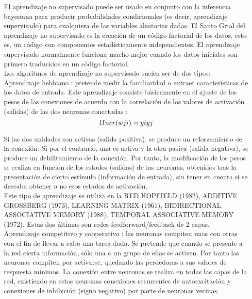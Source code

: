 \documentclass{article}
\theoremstyle{definition}
\theoremstyle{remark}
\begin{document}
El aprendizaje no supervisado puede ser usado en conjunto con la inferencia bayesiana para producir probabilidades condicionales (es decir, aprendizaje supervisado) para cualquiera de las variables aleatorias dadas. El Santo Grial del aprendizaje no supervisado es la creación de un código factorial de los datos, esto es, un código con componentes estadísticamente independientes. El aprendizaje supervisado normalmente funciona mucho mejor cuando los datos iniciales son primero traducidos en un código factorial.\\

Los algoritmos de aprendizaje no supervisado suelen ser de dos tipos: \\

Aprendizaje hebbiano : pretende medir la familiaridad o extraer características de los datos de entrada. Este aprendizaje consiste básicamente en el ajuste de los pesos de las conexiones de acuerdo con la correlación de los valores de activación (salidas) de las dos neuronas conectadas : \\

\begin{equation}\\l
  Incr (wji) = yi yj
\end{equation}

Si las dos unidades son activas (salida positiva), se produce un reforzamiento de la conexión. Si por el contrario, una es activa y la otra pasiva (salida negativa), se produce un debilitamiento de la conexión. Por tanto, la modificación de los pesos se realiza en función de los estados (salidas) de las neuronas, obtenidos tras la presentación de cierto estímulo (información de entrada), sin tener en cuenta si se deseaba obtener o no esos estados de activación.\\
Este tipo de aprendizaje se utiliza en la RED HOPFIELD (1982), ADDITIVE GROSSBERG (1973), LEARNING MATRIX (1961), BIDIRECTIONAL ASSOCIATIVE MEMORY (1988), TEMPORAL ASSOCIATIVE MEMORY (1972). Estas dos últimas son redes feedforward/feedback de 2 capas.\\
Aprendizaje competitivo y cooperativo : las neuronas compiten unas con otras con el fin de llevar a cabo una tarea dada. Se pretende que cuando se presente a la red cierta información, sólo una o un grupo de ellas se activen. Por tanto las neuronas compiten por activarse, quedando las perdedoras a sus valores de respuesta mínimos. La conexión entre neuronas se realiza en todas las capas de la red, existiendo en estas neuronas conexiones recurrentes de autoexcitación y conexiones de inhibición (signo negativo) por parte de neuronas vecinas.
\end{document}
